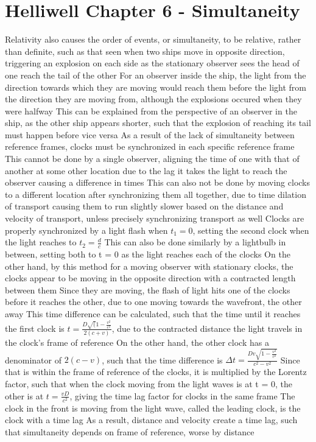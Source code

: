 \documentclass[11 pt, twoside]{article}
\newenvironment{outline*}
{
	\begin{outline}[enumerate]
	}
	{\end{outline}
}
\begin{document}
\section{Helliwell Chapter 6 - Simultaneity}
\begin{outline*}
\1 Relativity also causes the order of events, or simultaneity, to be relative, rather than definite, such as that seen when two ships move in opposite direction, triggering an explosion on each side as the stationary observer sees the head of one reach the tail of the other
\2 For an observer inside the ship, the light from the direction towards which they are moving would reach them before the light from the direction they are moving from, although the explosions occured when they were halfway
\2 This can be explained from the perspective of an observer in the ship, as the other ship appears shorter, such that the explosion of reaching its tail must happen before vice versa
\1 As a result of the lack of simultaneity between reference frames, clocks must be synchronized in each specific reference frame
\2 This cannot be done by a single observer, aligning the time of one with that of another at some other location due to the lag it takes the light to reach the observer causing a difference in times
\2 This can also not be done by moving clocks to a different location after synchronizing them all together, due to time dilation of transport causing them to run slightly slower based on the distance and velocity of transport, unless precisely synchronizing transport as well
\2 Clocks are properly synchronized by a light flash when $t_1 = 0$, setting the second clock when the light reaches to $t_2 = \frac{d}{c}$
\3 This can also be done similarly by a lightbulb in between, setting both to t = 0 as the light reaches each of the clocks
\2 On the other hand, by this method for a moving observer with stationary clocks, the clocks appear to be moving in the opposite direction with a contracted length between them
\3 Since they are moving, the flash of light hits one of the clocks before it reaches the other, due to one moving towards the wavefront, the other away
\3 This time difference can be calculated, such that the time until it reaches the first clock is $t = \frac{D\sqrt(1 - \frac{v^2}{c^2}}{2(c + v)}$, due to the contracted distance the light travels in the clock's frame of reference
\4 On the other hand, the other clock has a denominator of $2(c - v)$, such that the time difference is $\Delta t = \frac{Dv\sqrt{1 - \frac{v^2}{c^2}}}{c^2 - v^2}$
\4 Since that is within the frame of reference of the clocks, it is multiplied by the Lorentz factor, such that when the clock moving from the light waves is at t = 0, the other is at $t = \frac{vD}{c^2}$, giving the time lag factor for clocks in the same frame
\4 The clock in the front is moving from the light wave, called the leading clock, is the clock with a time lag
\3 As a result, distance and velocity create a time lag, such that simultaneity depends on frame of reference, worse by distance
\end{outline*}
\end{document}
